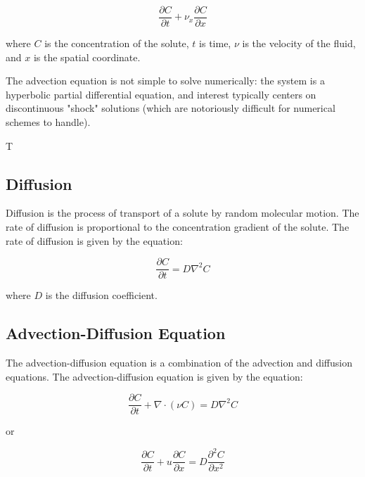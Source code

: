 \documentclass{tufte-handout}\usepackage[]{graphicx}\usepackage[]{xcolor}
\begin{document}
\begin{equation}
\frac{\partial C}{\partial t} + \nu_x \frac{\partial C}{\partial x}
\end{equation}

where $C$ is the concentration of the solute, $t$ is time, $\nu$ is the velocity of the fluid, and $x$ is the spatial coordinate.


The advection equation is not simple to solve numerically: the system is a hyperbolic partial differential equation, and interest typically centers on discontinuous "shock" solutions (which are notoriously difficult for numerical schemes to handle).

T


\subsection{Diffusion}

Diffusion is the process of transport of a solute by random molecular motion. The rate of diffusion is proportional to the concentration gradient of the solute. The rate of diffusion is given by the equation:

\begin{equation}
\frac{\partial C}{\partial t} = D \nabla^2 C
\end{equation}

where $D$ is the diffusion coefficient.

\subsection{Advection-Diffusion Equation}

The advection-diffusion equation is a combination of the advection and diffusion equations. The advection-diffusion equation is given by the equation:

\begin{equation}
\frac{\partial C}{\partial t} + \nabla \cdot (\nu C) = D \nabla^2 C
\end{equation}

or 

\begin{equation}
\frac{\partial C}{\partial t} + u \frac{\partial C}{\partial x} = D \frac{\partial^2 C}{\partial x^2}
\end{equation}
\end{document}
